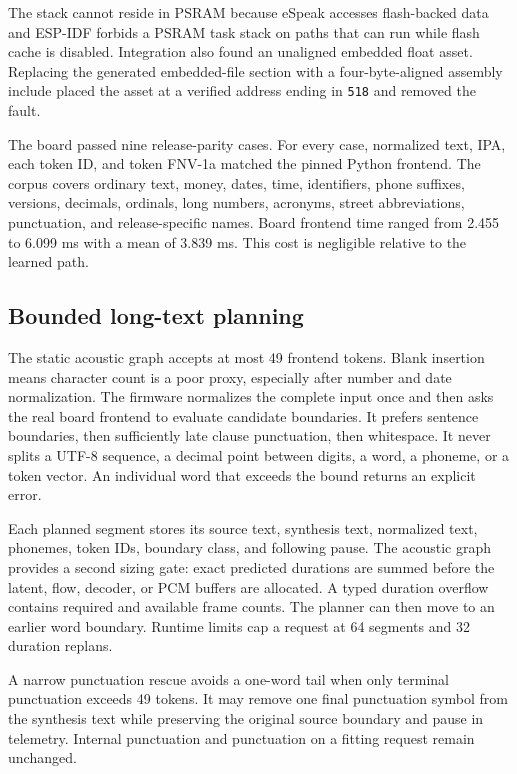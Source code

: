 \documentclass[10pt]{article}
\begin{document}
The stack cannot reside in PSRAM because eSpeak accesses flash-backed data and
ESP-IDF forbids a PSRAM task stack on paths that can run while flash cache is
disabled. Integration also found an unaligned embedded float asset. Replacing
the generated embedded-file section with a four-byte-aligned assembly include
placed the asset at a verified address ending in \texttt{518} and removed the
fault.

The board passed nine release-parity cases. For every case, normalized text,
IPA, each token ID, and token FNV-1a matched the pinned Python frontend. The
corpus covers ordinary text, money, dates, time, identifiers, phone suffixes,
versions, decimals, ordinals, long numbers, acronyms, street abbreviations,
punctuation, and release-specific names. Board frontend time ranged from
2.455 to 6.099 ms with a mean of 3.839 ms. This cost is negligible relative
to the learned path.

\subsection{Bounded long-text planning}

The static acoustic graph accepts at most 49 frontend tokens. Blank insertion
means character count is a poor proxy, especially after number and date
normalization. The firmware normalizes the complete input once and then asks
the real board frontend to evaluate candidate boundaries. It prefers sentence
boundaries, then sufficiently late clause punctuation, then whitespace. It
never splits a UTF-8 sequence, a decimal point between digits, a word, a
phoneme, or a token vector. An individual word that exceeds the bound returns
an explicit error.

Each planned segment stores its source text, synthesis text, normalized text,
phonemes, token IDs, boundary class, and following pause. The acoustic graph
provides a second sizing gate: exact predicted durations are summed before the
latent, flow, decoder, or PCM buffers are allocated. A typed duration overflow
contains required and available frame counts. The planner can then move to an
earlier word boundary. Runtime limits cap a request at 64 segments and 32
duration replans.

A narrow punctuation rescue avoids a one-word tail when only terminal
punctuation exceeds 49 tokens. It may remove one final punctuation symbol from
the synthesis text while preserving the original source boundary and pause in
telemetry. Internal punctuation and punctuation on a fitting request remain
unchanged.
\end{document}
